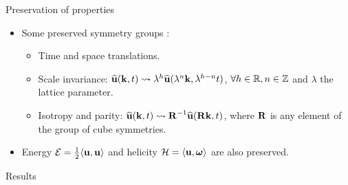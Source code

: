 \documentclass{beamer} %
\begin{document}
\begin{frame}{Preservation of properties}
  \begin{itemize}
    \item Some preserved symmetry groups \cite{campolina}:
          \begin{itemize}
            \item Time and space translations.
            \item Scale invariance: $\widehat{\boldsymbol{\mathrm{u}}}(\boldsymbol{\mathrm{k}},t) \rightsquigarrow \lambda^h \widehat{\boldsymbol{\mathrm{u}}}(\lambda^n \boldsymbol{\mathrm{k}},\lambda^{h-n} t)$, $\forall h\in \mathbb{R}, n\in\mathbb{Z}$ and $\lambda$ the lattice parameter.
            \item Isotropy and parity: $\widehat{\boldsymbol{\mathrm{u}}}(\boldsymbol{\mathrm{k}},t) \rightsquigarrow \boldsymbol{\mathrm{R}}^{-1} \widehat{\boldsymbol{\mathrm{u}}}(\boldsymbol{\mathrm{R}}\boldsymbol{\mathrm{k}},t)$, where $\boldsymbol{\mathrm{R}}$ is any element of the group of cube symmetries.
          \end{itemize}
    \item Energy $\mathcal{E}=\frac{1}{2} \langle {\boldsymbol{\mathrm{u}}}, {\boldsymbol{\mathrm{u}}} \rangle$ and helicity $\mathcal{H}=\langle {\boldsymbol{\mathrm{u}}}, {\boldsymbol{\mathrm{\omega}}} \rangle$ are also preserved.

  \end{itemize}

\end{frame}
{
\begin{frame}[plain]
  \centering\vfill\Huge
  Results
  \vfill
\end{frame}
\addtocounter{framenumber}{-1}
}
\end{document}
